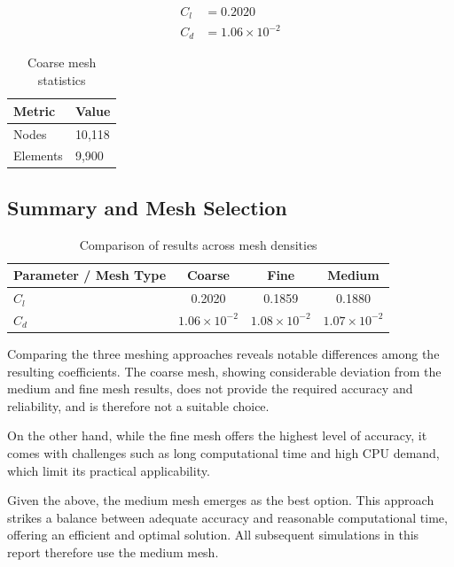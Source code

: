 \documentclass[12pt,a4paper]{article}
\begin{document}
\begin{align*}
C_l &= 0.2020 \\
C_d &= 1.06 \times 10^{-2}
\end{align*}

\begin{table}[H]
\centering
\begin{tabular}{ll}
\toprule
\textbf{Metric} & \textbf{Value} \\
\midrule
Nodes & 10{,}118 \\
Elements & 9{,}900 \\
\bottomrule
\end{tabular}
\caption{Coarse mesh statistics}
\label{tab:coarse_stat}
\end{table}

\subsection{Summary and Mesh Selection}

\begin{table}[H]
\centering
\begin{tabular}{lccc}
\toprule
\textbf{Parameter / Mesh Type} & \textbf{Coarse} & \textbf{Fine} & \textbf{Medium} \\
\midrule
$C_l$ & 0.2020 & 0.1859 & 0.1880 \\
$C_d$ & $1.06 \times 10^{-2}$ & $1.08 \times 10^{-2}$ & $1.07 \times 10^{-2}$ \\
\bottomrule
\end{tabular}
\caption{Comparison of results across mesh densities}
\label{tab:mesh_comp}
\end{table}

Comparing the three meshing approaches reveals notable differences among the resulting coefficients. The coarse mesh, showing considerable deviation from the medium and fine mesh results, does not provide the required accuracy and reliability, and is therefore not a suitable choice.

On the other hand, while the fine mesh offers the highest level of accuracy, it comes with challenges such as long computational time and high CPU demand, which limit its practical applicability.

Given the above, the medium mesh emerges as the best option. This approach strikes a balance between adequate accuracy and reasonable computational time, offering an efficient and optimal solution. All subsequent simulations in this report therefore use the medium mesh.
\end{document}
